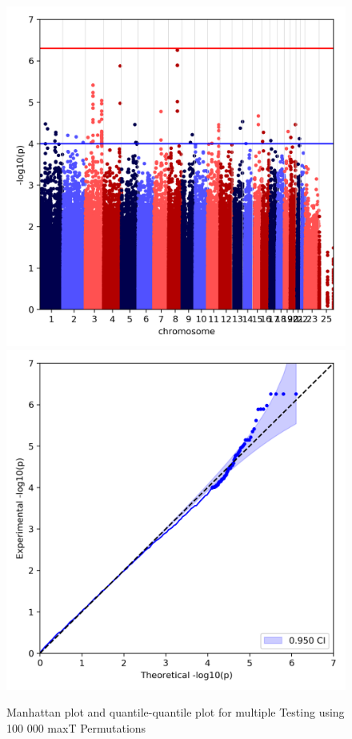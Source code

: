 \documentclass[12pt]{article}
\begin{document}
\begin{figure}[h!]
    \centering
    \includegraphics[scale=0.5]{img/manhattan_plot.png}
    \includegraphics[scale=0.5]{img/qq_plot.png}
    \caption{Manhattan plot and quantile-quantile plot for multiple Testing using 100 000 maxT Permutations}
    \label{fig:1000Permutations}
\end{figure}
\end{document}
